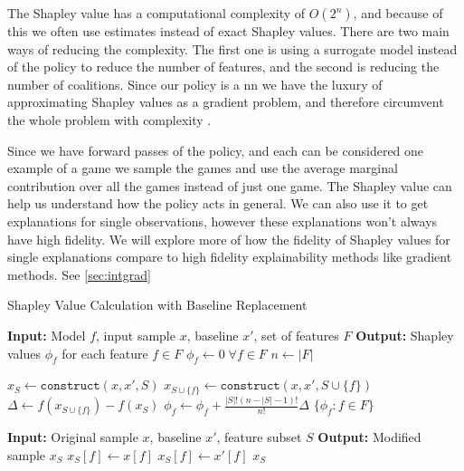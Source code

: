 \documentclass[UKenglish]{uiomasterthesis}
\begin{document}
The Shapley value has a computational complexity of $O(2^n)$, and because of this we often use estimates instead of exact Shapley values. There are two main ways of reducing the complexity. The first one is using a surrogate model instead of the policy to reduce the number of features, and the second is reducing the number of coalitions. Since our policy is a \ac{nn} we have the luxury of approximating Shapley values as a gradient problem, and therefore circumvent the whole problem with complexity \cite{captum_shap}.

Since we have forward passes of the policy, and each can be considered one example of a game we sample the games and use the average marginal contribution over all the games instead of just one game.
The Shapley value can help us understand how the policy acts in general. We can also use it to get explanations for single observations, however these explanations won't always have high fidelity. We will explore more of how the fidelity of Shapley values for single explanations compare to high fidelity explainability methods like gradient methods. See \cref{sec:intgrad}

\begin{algorithm}
\caption{Shapley Value Calculation with Baseline Replacement}
\label{alg:shapley}
\begin{algorithmic}
    \State \textbf{Input:} Model $f$, input sample $x$, baseline $x'$, set of features $F$
    \State \textbf{Output:} Shapley values $\phi_f$ for each feature $f \in F$
    \State $\phi_f \gets 0 \; \forall f \in F$ 
    \State $n \gets |F|$ 
    
            \State $x_S \gets \texttt{construct}(x, x', S)$ 
            \State $x_{S \cup \{f\}} \gets \texttt{construct}(x, x', S \cup \{f\})$
            \State $\Delta \gets f(x_{S \cup \{f\}}) - f(x_S)$ 
            \State $\phi_f \gets \phi_f + \frac{|S|!(n - |S| - 1)!}{n!} \Delta$
        \EndFor
    \EndFor
    \State \Return $\{\phi_f : f \in F\}$
    
        \State \textbf{Input:} Original sample $x$, baseline $x'$, feature subset $S$
        \State \textbf{Output:} Modified sample $x_S$
                \State $x_S[f] \gets x[f]$
            \Else
                \State $x_S[f] \gets x'[f]$ 
            \EndIf
        \EndFor
        \State \Return $x_S$
    \EndFunction
\end{algorithmic}
\end{algorithm}
\end{document}
